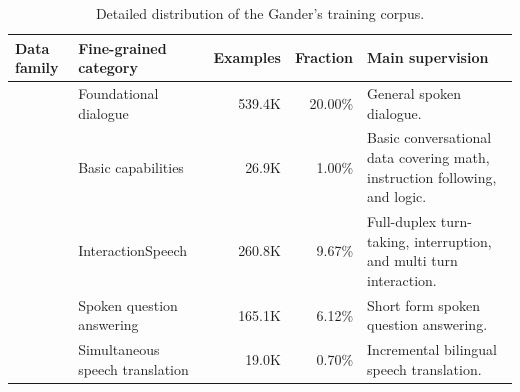 \begin{table}[t]
    \centering
    \caption{
        Detailed distribution of the Gander's training corpus.
    }
    \label{tab:gander_training_data}
    \small
    \setlength{\tabcolsep}{4pt}
    \renewcommand{\arraystretch}{1.10}

    \begin{tabularx}{\textwidth}{
        @{}
        >{\raggedright\arraybackslash}m{2.25cm}
        >{\raggedright\arraybackslash}p{4.2cm}
        r
        r
        >{\raggedright\arraybackslash}X
        @{}
    }
        \toprule
        \textbf{Data family}
        & \textbf{Fine-grained category}
        & \textbf{Examples}
        & \textbf{Fraction}
        & \textbf{Main supervision} \\
        \midrule

        \multirow[c]{5}{=}{
            \textbf{Speech Interaction}
        }
        &
        Foundational dialogue
        &
        539.4K
        &
        20.00\%
        &
        General spoken dialogue.
        \\

        \cmidrule(lr){2-5}

        &
        Basic capabilities
        &
        26.9K
        &
        1.00\%
        &
        Basic conversational data covering math, instruction following, and logic.
        \\

        \cmidrule(lr){2-5}

        &
        InteractionSpeech
        &
        260.8K
        &
        9.67\%
        &
        Full-duplex turn-taking, interruption, and multi turn interaction.
        \\

        \cmidrule(lr){2-5}

        &
        Spoken question answering
        &
        165.1K
        &
        6.12\%
        &
        Short form spoken question answering.
        \\

        \cmidrule(lr){2-5}

        &
        Simultaneous speech translation
        &
        19.0K
        &
        0.70\%
        &
        Incremental bilingual speech translation.
        \\


\end{tabularx}
\end{table}
